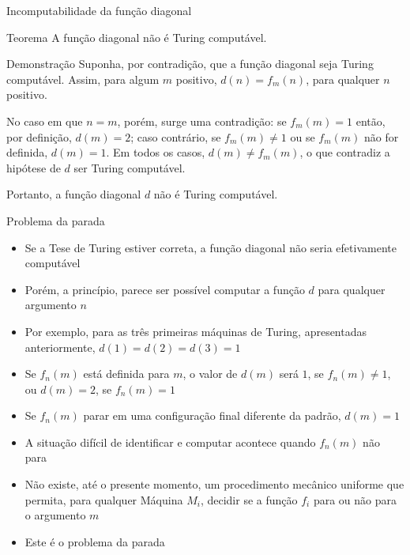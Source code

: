 \begin{frame}[fragile]{Incomputabilidade da função diagonal}

    \begin{block}{Teorema}
        A função diagonal não é Turing computável.
    \end{block}

    \begin{block}{Demonstração}
        Suponha, por contradição, que a função diagonal seja Turing computável. Assim, para algum
        $m$ positivo, $d(n) = f_m(n)$, para qualquer $n$ positivo. 

        \vspace{0.1in}

        No caso em que $n = m$, porém, surge uma contradição: se $f_m(m) = 1$ então, por definição,
        $d(m) = 2$; caso contrário, se $f_m(m)\neq 1$ ou se $f_m(m)$ não for definida, $d(m) = 1$.
        Em todos os casos, $d(m) \neq f_m(m)$, o que contradiz a hipótese de $d$ ser Turing
        computável.
     
        \vspace{0.1in}

        Portanto, a função diagonal $d$ não é Turing computável.
    \end{block}

\end{frame}

\begin{frame}[fragile]{Problema da parada}

    \begin{itemize}
        \item Se a Tese de Turing estiver correta, a função diagonal não seria efetivamente 
            computável

        \item Porém, a princípio, parece ser possível computar a função $d$ para qualquer
            argumento $n$

        \item Por exemplo, para as três primeiras máquinas de Turing, apresentadas anteriormente,
            $d(1) = d(2) = d(3) = 1$

        \item Se $f_n(m)$ está definida para $m$, o valor de $d(m)$ será $1$, se $f_n(m) \neq 1$, ou
            $d(m) = 2$, se $f_n(m) = 1$

        \item Se $f_n(m)$ parar em uma configuração final diferente da padrão, $d(m) = 1$

        \item A situação difícil de identificar e computar acontece quando $f_n(m)$ não para

        \item Não existe, até o presente momento, um procedimento mecânico uniforme que permita,
            para qualquer Máquina $M_i$, decidir se a função $f_i$ para ou não para o argumento
        $m$

        \item Este é o problema da parada
    \end{itemize}

\end{frame}

